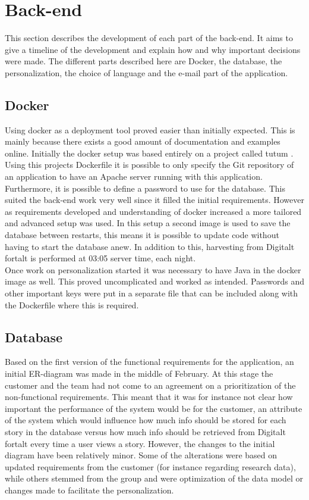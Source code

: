 \section{Back-end}

This section describes the development of each part of the back-end. It aims to give a timeline of the development and explain how and why important decisions were made. The different parts described here are Docker, the database, the personalization, the choice of language and the e-mail part of the application.  

\subsection{Docker}

Using docker as a deployment tool proved easier than initially expected. This is mainly because there exists a good amount of documentation and examples online. Initially the docker setup was based entirely on a project called tutum \cite{EHW3}. Using this projects Dockerfile it is possible to only specify the Git repository of an application to have an Apache server running with this application. Furthermore, it is possible to define a password to use for the database. This suited the back-end work very well since it filled the initial requirements. However as requirements developed and understanding of docker increased a more tailored and advanced setup was used. In this setup a second image is used to save the database between restarts, this means it is possible to update code without having to start the database anew. In addition to this, harvesting from Digitalt fortalt is performed at 03:05 server time, each night. \\

Once work on personalization started it was necessary to have Java in the docker image as well. This proved uncomplicated and worked as intended. Passwords and other important keys were put in a separate file that can be included along with the Dockerfile where this is required.

\subsection{Database}

Based on the first version of the functional requirements for the application, an initial ER-diagram was made in the middle of February. At this stage the customer and the team had not come to an agreement on a prioritization of the non-functional requirements. This meant that it was for instance not clear how important the performance of the system would be for the customer, an attribute of the system which would influence how much info should be stored for each story in the database versus how much info should be retrieved from Digitalt fortalt every time a user views a story. However, the changes to the initial diagram have been relatively minor. Some of the alterations were based on updated requirements from the customer (for instance regarding research data), while others stemmed from the group and were optimization of the data model or changes made to facilitate the personalization.\newline

